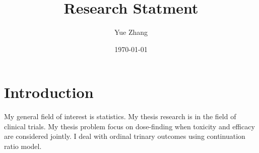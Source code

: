\documentclass[12pt]{article}
\begin{document}
 

\title{Research Statment}
\author{Yue Zhang }
\date{\today}

\maketitle
\section{Introduction}
My general field of interest is statistics. My thesis research is in the field of clinical trials. My thesis problem focus on dose-finding when toxicity and efficacy are considered jointly. I deal with ordinal trinary outcomes using continuation ratio model. 
\end{document}
